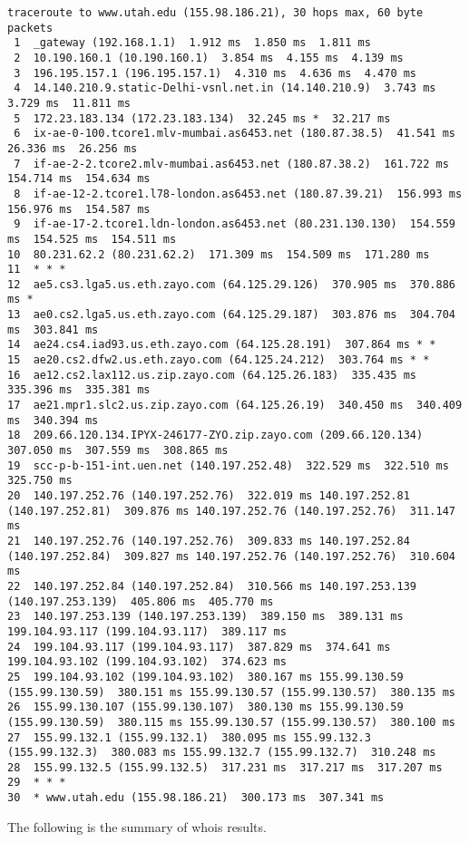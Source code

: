 \documentclass[a4paper]{article}
\newcommand{\nln}{\vspace{0.2cm}}
\begin{document}
\begin{lstlisting}
traceroute to www.utah.edu (155.98.186.21), 30 hops max, 60 byte packets
 1  _gateway (192.168.1.1)  1.912 ms  1.850 ms  1.811 ms
 2  10.190.160.1 (10.190.160.1)  3.854 ms  4.155 ms  4.139 ms
 3  196.195.157.1 (196.195.157.1)  4.310 ms  4.636 ms  4.470 ms
 4  14.140.210.9.static-Delhi-vsnl.net.in (14.140.210.9)  3.743 ms  3.729 ms  11.811 ms
 5  172.23.183.134 (172.23.183.134)  32.245 ms *  32.217 ms
 6  ix-ae-0-100.tcore1.mlv-mumbai.as6453.net (180.87.38.5)  41.541 ms  26.336 ms  26.256 ms
 7  if-ae-2-2.tcore2.mlv-mumbai.as6453.net (180.87.38.2)  161.722 ms  154.714 ms  154.634 ms
 8  if-ae-12-2.tcore1.l78-london.as6453.net (180.87.39.21)  156.993 ms  156.976 ms  154.587 ms
 9  if-ae-17-2.tcore1.ldn-london.as6453.net (80.231.130.130)  154.559 ms  154.525 ms  154.511 ms
10  80.231.62.2 (80.231.62.2)  171.309 ms  154.509 ms  171.280 ms
11  * * *
12  ae5.cs3.lga5.us.eth.zayo.com (64.125.29.126)  370.905 ms  370.886 ms *
13  ae0.cs2.lga5.us.eth.zayo.com (64.125.29.187)  303.876 ms  304.704 ms  303.841 ms
14  ae24.cs4.iad93.us.eth.zayo.com (64.125.28.191)  307.864 ms * *
15  ae20.cs2.dfw2.us.eth.zayo.com (64.125.24.212)  303.764 ms * *
16  ae12.cs2.lax112.us.zip.zayo.com (64.125.26.183)  335.435 ms  335.396 ms  335.381 ms
17  ae21.mpr1.slc2.us.zip.zayo.com (64.125.26.19)  340.450 ms  340.409 ms  340.394 ms
18  209.66.120.134.IPYX-246177-ZYO.zip.zayo.com (209.66.120.134)  307.050 ms  307.559 ms  308.865 ms
19  scc-p-b-151-int.uen.net (140.197.252.48)  322.529 ms  322.510 ms  325.750 ms
20  140.197.252.76 (140.197.252.76)  322.019 ms 140.197.252.81 (140.197.252.81)  309.876 ms 140.197.252.76 (140.197.252.76)  311.147 ms
21  140.197.252.76 (140.197.252.76)  309.833 ms 140.197.252.84 (140.197.252.84)  309.827 ms 140.197.252.76 (140.197.252.76)  310.604 ms
22  140.197.252.84 (140.197.252.84)  310.566 ms 140.197.253.139 (140.197.253.139)  405.806 ms  405.770 ms
23  140.197.253.139 (140.197.253.139)  389.150 ms  389.131 ms 199.104.93.117 (199.104.93.117)  389.117 ms
24  199.104.93.117 (199.104.93.117)  387.829 ms  374.641 ms 199.104.93.102 (199.104.93.102)  374.623 ms
25  199.104.93.102 (199.104.93.102)  380.167 ms 155.99.130.59 (155.99.130.59)  380.151 ms 155.99.130.57 (155.99.130.57)  380.135 ms
26  155.99.130.107 (155.99.130.107)  380.130 ms 155.99.130.59 (155.99.130.59)  380.115 ms 155.99.130.57 (155.99.130.57)  380.100 ms
27  155.99.132.1 (155.99.132.1)  380.095 ms 155.99.132.3 (155.99.132.3)  380.083 ms 155.99.132.7 (155.99.132.7)  310.248 ms
28  155.99.132.5 (155.99.132.5)  317.231 ms  317.217 ms  317.207 ms
29  * * *
30  * www.utah.edu (155.98.186.21)  300.173 ms  307.341 ms
\end{lstlisting}
\nln
The following is the summary of whois results.
\end{document}

